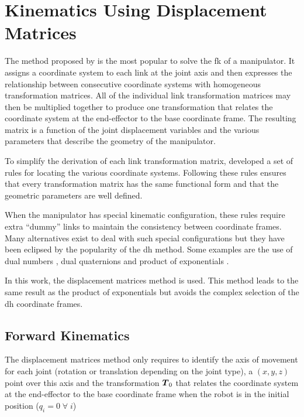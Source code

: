 \chapter{Kinematics Using Displacement Matrices}
\label{ch:kinematics}

The method proposed by \citeauthor{Denavit1955} \cite{Denavit1955,Paul1981} is the most popular to solve the \acf{fk} of a manipulator. It assigns a coordinate system to each link at the joint axis and then expresses the relationship between consecutive coordinate systems with homogeneous transformation matrices. All of the individual link transformation matrices may then be multiplied together to produce one transformation that relates the coordinate system at the end-effector to the base coordinate frame. The resulting matrix is a function of the joint displacement variables and the various parameters that describe the geometry of the manipulator.

To simplify the derivation of each link transformation matrix, \citeauthor{Denavit1955} developed a set of rules for locating the various coordinate systems.
Following these rules ensures that every transformation matrix has the same functional form and that the geometric parameters are well defined.

When the manipulator has special kinematic configuration, these rules require extra ``dummy'' links to maintain the consistency between coordinate frames. Many alternatives exist to deal with such special configurations but they have been eclipsed by the popularity of the \ac{dh} method. Some examples are the use of dual numbers \cite{Veldkamp1976,McCarthy1986}, dual quaternions \cite{Perez2004} and product of exponentials \cite{Brockett1984}.

In this work, the displacement matrices method \cite{Barrientos2012} is used. This method leads to the same result as the product of exponentials but avoids the complex selection of the \ac{dh} coordinate frames. 


\section{Forward Kinematics}

The displacement matrices method only requires to identify the axis of movement for each joint (rotation or translation depending on the joint type), a $(x,y,z)$ point over this axis and the transformation $\boldsymbol{T}_0$ that relates the coordinate system at the end-effector to the base coordinate frame when the robot is in the initial position ($q_i=0\;\forall{}\;i$)

